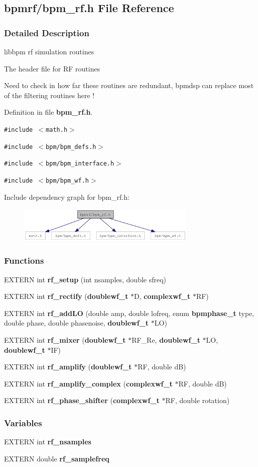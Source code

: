\subsection{bpmrf/bpm\_\-rf.h File Reference}
\label{bpm__rf_8h}


\subsubsection{Detailed Description}
libbpm rf simulation routines 

The header file for RF routines

Need to check in how far these routines are redundant, bpmdsp can replace most of the filtering routines here ! 

Definition in file {\bf bpm\_\-rf.h}.

{\tt \#include $<$math.h$>$}\par
{\tt \#include $<$bpm/bpm\_\-defs.h$>$}\par
{\tt \#include $<$bpm/bpm\_\-interface.h$>$}\par
{\tt \#include $<$bpm/bpm\_\-wf.h$>$}\par


Include dependency graph for bpm\_\-rf.h:\nopagebreak
\begin{figure}[H]
\begin{center}
\leavevmode
\includegraphics[width=242pt]{bpm__rf_8h__incl}
\end{center}
\end{figure}
\subsubsection*{Functions}
\begin{CompactItemize}
\item 
EXTERN int {\bf rf\_\-setup} (int nsamples, double sfreq)
\item 
EXTERN int {\bf rf\_\-rectify} ({\bf doublewf\_\-t} $\ast$D, {\bf complexwf\_\-t} $\ast$RF)
\item 
EXTERN int {\bf rf\_\-addLO} (double amp, double lofreq, enum {\bf bpmphase\_\-t} type, double phase, double phasenoise, {\bf doublewf\_\-t} $\ast$LO)
\item 
EXTERN int {\bf rf\_\-mixer} ({\bf doublewf\_\-t} $\ast$RF\_\-Re, {\bf doublewf\_\-t} $\ast$LO, {\bf doublewf\_\-t} $\ast$IF)
\item 
EXTERN int {\bf rf\_\-amplify} ({\bf doublewf\_\-t} $\ast$RF, double dB)
\item 
EXTERN int {\bf rf\_\-amplify\_\-complex} ({\bf complexwf\_\-t} $\ast$RF, double dB)
\item 
EXTERN int {\bf rf\_\-phase\_\-shifter} ({\bf complexwf\_\-t} $\ast$RF, double rotation)
\end{CompactItemize}
\subsubsection*{Variables}
\begin{CompactItemize}
\item 
EXTERN int {\bf rf\_\-nsamples}
\item 
EXTERN double {\bf rf\_\-samplefreq}
\end{CompactItemize}
